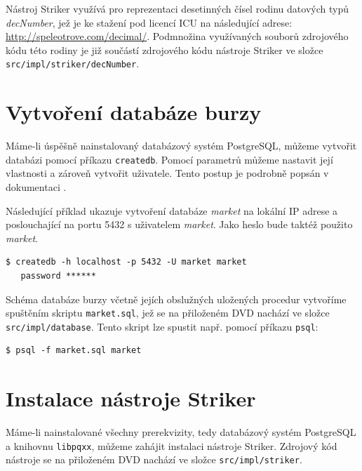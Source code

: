 \documentclass[thesis=M,czech]{FITthesis}[2012/06/26]
\begin{document}
Nástroj Striker využívá pro reprezentaci desetinných čísel rodinu datových typů \textit{decNumber}, jež je ke stažení 
pod licencí ICU na následující adrese: \url{http://speleotrove.com/decimal/}. Podmnožina využívaných souborů 
zdrojového kódu této rodiny je již součástí zdrojového kódu nástroje Striker ve složce \texttt{src/impl/striker/decNumber}.



\section{Vytvoření databáze burzy}

Máme-li úspěšně nainstalovaný databázový systém PostgreSQL, můžeme vytvořit databázi pomocí příkazu 
\texttt{createdb}. Pomocí parametrů můžeme nastavit její vlastnosti a zároveň vytvořit uživatele. Tento 
postup je podrobně popsán v dokumentaci \cite{pgdoc}.

Následující příklad ukazuje vytvoření databáze \textit{market} na lokální IP adrese a poslouchající na portu 5432 
s uživatelem \textit{market}. Jako heslo bude taktéž použito \textit{market}.

\begin{lstlisting}[basicstyle={\small\ttfamily}] 
   $ createdb -h localhost -p 5432 -U market market
   password ******
\end{lstlisting}

Schéma databáze burzy včetně jejích obslužných uložených procedur vytvoříme spuštěním skriptu \texttt{market.sql}, 
jež se na přiloženém DVD nachází ve složce \texttt{src/impl/database}. Tento skript lze spustit např. pomocí 
příkazu \texttt{psql}:

\begin{lstlisting}[basicstyle={\small\ttfamily}] 
   $ psql -f market.sql market
\end{lstlisting}


\section{Instalace nástroje Striker}

Máme-li nainstalované všechny prerekvizity, tedy databázový systém PostgreSQL a knihovnu \texttt{libpqxx}, můžeme zahájit 
instalaci nástroje Striker. Zdrojový kód nástroje se na přiloženém DVD nachází ve složce \texttt{src/impl/striker}.
\end{document}
